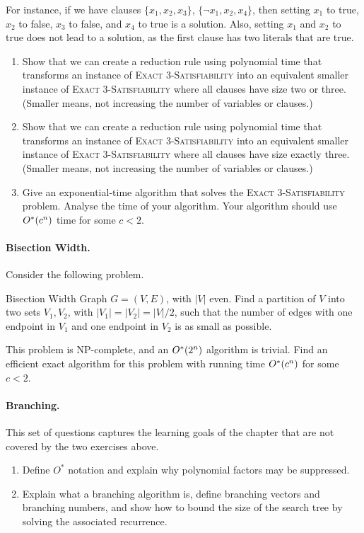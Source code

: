 For instance, if we have clauses $\{x_1,x_2,x_3\}$, $\{\lnot x_1, x_2, x_4\}$,
then setting $x_1$ to true, $x_2$ to false, $x_3$ to false, and $x_4$ to true is
a solution. Also, setting $x_1$ and $x_2$ to true does not lead to a solution, as
the first clause has two literals that are true.
\begin{enumerate}
  \item Show that we can create a reduction rule using polynomial time that
        transforms an instance of \textsc{Exact 3-Satisfiability} into an
        equivalent smaller instance of \textsc{Exact 3-Satisfiability} where all
        clauses have size two or three. (Smaller means, not increasing the number
        of variables or clauses.)
  \item Show that we can create a reduction rule using polynomial time that
        transforms an instance of \textsc{Exact 3-Satisfiability} into an
        equivalent smaller instance of \textsc{Exact 3-Satisfiability} where all
        clauses have size exactly three. (Smaller means, not increasing the
        number of variables or clauses.)
  \item Give an exponential-time algorithm that solves the \textsc{Exact
        3-Satisfiability} problem. Analyse the time of your algorithm. Your
        algorithm should use $O^{*}(c^n)$ time for some $c < 2$.
\end{enumerate}

\paragraph{Bisection Width.}
Consider the following problem.
\begin{probdef}{Bisection Width}
  \instance Graph $G = (V,E)$, with $|V|$ even.
  \goal Find a partition of $V$ into two sets $V_1, V_2$, with
  $|V_1| = |V_2| = |V|/2$, such that the number of edges with one endpoint in
  $V_1$ and one endpoint in $V_2$ is as small as possible.
\end{probdef}
This problem is NP-complete, and an $O^{*}(2^n)$ algorithm is trivial. Find an
efficient exact algorithm for this problem with running time $O^{*}(c^n)$ for
some $c < 2$.

\paragraph{Branching.}
This set of questions captures the learning goals of the chapter that are not
covered by the two exercises above.
\begin{enumerate}
  \item Define $O^{*}$ notation and explain why polynomial factors may be
        suppressed.
  \item Explain what a branching algorithm is, define branching vectors and
        branching numbers, and show how to bound the size of the search tree by
        solving the associated recurrence.
\end{enumerate}

